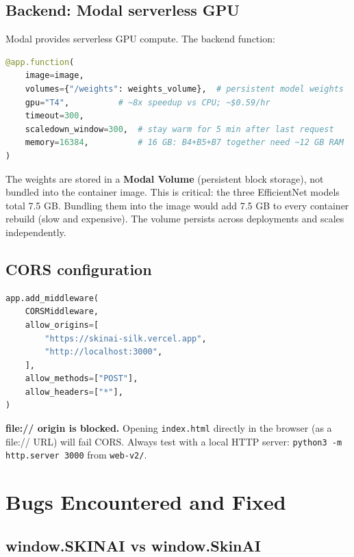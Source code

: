 \documentclass[12pt,a4paper]{article}
\begin{document}
\subsection{Backend: Modal serverless GPU}

Modal provides serverless GPU compute. The backend function:

\begin{lstlisting}[language=Python]
@app.function(
    image=image,
    volumes={"/weights": weights_volume},  # persistent model weights
    gpu="T4",          # ~8x speedup vs CPU; ~$0.59/hr
    timeout=300,
    scaledown_window=300,  # stay warm for 5 min after last request
    memory=16384,          # 16 GB: B4+B5+B7 together need ~12 GB RAM
)
\end{lstlisting}

The weights are stored in a \textbf{Modal Volume} (persistent block storage), not bundled into
the container image. This is critical: the three EfficientNet models total 7.5 GB. Bundling
them into the image would add 7.5 GB to every container rebuild (slow and expensive). The volume
persists across deployments and scales independently.

\subsection{CORS configuration}

\begin{lstlisting}[language=Python]
app.add_middleware(
    CORSMiddleware,
    allow_origins=[
        "https://skinai-silk.vercel.app",
        "http://localhost:3000",
    ],
    allow_methods=["POST"],
    allow_headers=["*"],
)
\end{lstlisting}

\begin{gotcha}
\textbf{file:// origin is blocked.} Opening \texttt{index.html} directly in the browser
(as a file:// URL) will fail CORS. Always test with a local HTTP server:
\texttt{python3 -m http.server 3000} from \texttt{web-v2/}.
\end{gotcha}

\section{Bugs Encountered and Fixed}

\subsection{window.SKINAI vs window.SkinAI}
\end{document}
